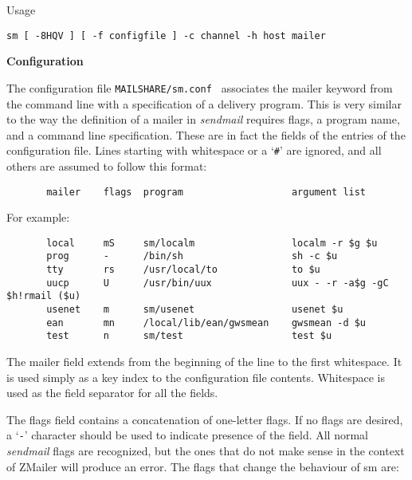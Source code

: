 Usage 

{\tt sm [ -8HQV ] [ -f configfile ] -c channel -h host mailer}





{\bf Configuration}

The configuration file {\tt MAILSHARE/sm.conf } associates the 
mailer keyword  from
the command line with a specification of a delivery program.  
This is very similar to the way the definition of a
mailer in  {\em sendmail\/} requires flags, a program name, and a
command line specification.  These are in fact the  fields
of  the entries of the configuration file.  Lines starting
with whitespace or a `{\tt \#}' are ignored, and all  
others are assumed to follow this format:

\begin{tscreen}
\begin{verbatim}
       mailer    flags  program                   argument list
\end{verbatim}
\end{tscreen}


For example:

\begin{tscreen}
\begin{verbatim}
       local     mS     sm/localm                 localm -r $g $u
       prog      -      /bin/sh                   sh -c $u
       tty       rs     /usr/local/to             to $u
       uucp      U      /usr/bin/uux              uux - -r -a$g -gC $h!rmail ($u)
       usenet    m      sm/usenet                 usenet $u
       ean       mn     /local/lib/ean/gwsmean    gwsmean -d $u
       test      n      sm/test                   test $u
\end{verbatim}
\end{tscreen}


The mailer field extends from the beginning of the line to
the first whitespace.  It is used simply as a key index to
the configuration  file  contents.  Whitespace is used as
the field separator for all the fields.

The flags field contains  a  concatenation  of  one-letter
flags.  If no flags are desired, a `{\tt -}' character should be
used to indicate presence of the field. All normal  {\em sendmail\/}  flags  are recognized, but the ones that do not make
sense in the context of ZMailer will  produce  an  error.
The flags that change the behaviour of sm are:

